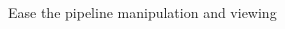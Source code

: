 \documentclass{beamer}
\begin{document}
\begin{frame}{Ease the pipeline manipulation and viewing}
    \begin{columns}
        \begin{column}{0.5\textwidth}



\end{column}
\end{columns}
\end{frame}
\end{document}

